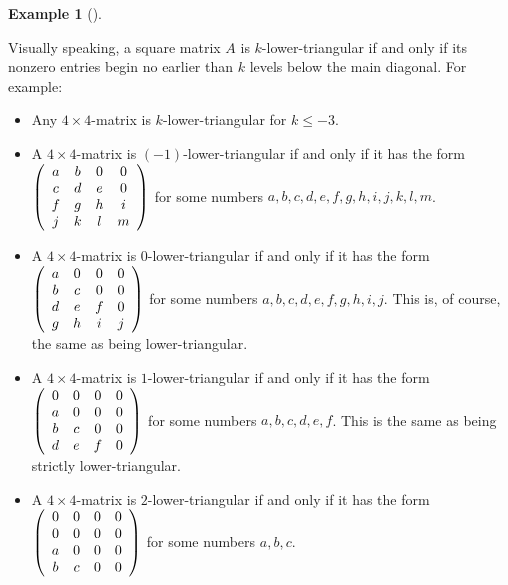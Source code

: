 \documentclass[numbers=enddot,12pt,final,onecolumn,notitlepage]{scrartcl}%
\theoremstyle{definition}
\newtheorem{exam}[theo]{Example}
\newenvironment{example}[1][]
{\begin{exam}[#1]\begin{leftbar}}
{\end{leftbar}\end{exam}}
\begin{document}
\begin{example}
Visually speaking, a square matrix $A$ is $k$-lower-triangular if and only if
its nonzero entries begin no earlier than $k$ levels below the main diagonal.
For example:

\begin{itemize}
\item Any $4\times4$-matrix is $k$-lower-triangular for $k\leq-3$.

\item A $4\times4$-matrix is $\left(  -1\right)  $-lower-triangular if and
only if it has the form $\left(
\begin{array}
[c]{cccc}%
a & b & 0 & 0\\
c & d & e & 0\\
f & g & h & i\\
j & k & l & m
\end{array}
\right)  $ for some numbers $a,b,c,d,e,f,g,h,i,j,k,l,m$.

\item A $4\times4$-matrix is $0$-lower-triangular if and only if it has the
form $\left(
\begin{array}
[c]{cccc}%
a & 0 & 0 & 0\\
b & c & 0 & 0\\
d & e & f & 0\\
g & h & i & j
\end{array}
\right)  $ for some numbers $a,b,c,d,e,f,g,h,i,j$. This is, of course, the
same as being lower-triangular.

\item A $4\times4$-matrix is $1$-lower-triangular if and only if it has the
form $\left(
\begin{array}
[c]{cccc}%
0 & 0 & 0 & 0\\
a & 0 & 0 & 0\\
b & c & 0 & 0\\
d & e & f & 0
\end{array}
\right)  $ for some numbers $a,b,c,d,e,f$. This is the same as being strictly lower-triangular.

\item A $4\times4$-matrix is $2$-lower-triangular if and only if it has the
form $\left(
\begin{array}
[c]{cccc}%
0 & 0 & 0 & 0\\
0 & 0 & 0 & 0\\
a & 0 & 0 & 0\\
b & c & 0 & 0
\end{array}
\right)  $ for some numbers $a,b,c$.


\end{itemize}
\end{example}
\end{document}
